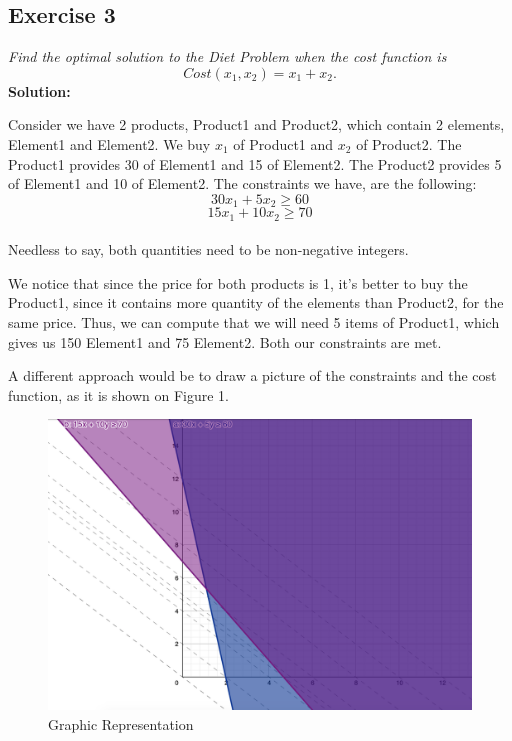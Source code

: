 \documentclass[12pt]{article}
\begin{document}
\subsection*{Exercise 3}
\textit{Find the optimal solution to the Diet Problem when the cost function is}\\
$$Cost(x_1, x_2) = x_1 + x_2.$$  
\textbf{Solution:} \par
Consider we have 2 products, Product1 and Product2, which contain 2 elements, Element1 and Element2. We buy $x_1$ of Product1 and $x_2$ of Product2. The Product1 provides 30 of Element1 and 15 of Element2. The Product2 provides 5 of Element1 and 10 of Element2. The constraints we have, are the following: \\
$$30x_1+5x_2 \geqslant 60$$ 
$$15x_1+10x_2 \geqslant 70$$ \\
Needless to say, both quantities need to be non-negative integers. \par
We notice that since the price for both products is 1, it's better to buy the Product1, since it contains more quantity of the elements than Product2, for the same price. Thus, we can compute that we will need 5 items of Product1, which gives us 150 Element1 and 75 Element2. Both our constraints are met. \par 
A different approach would be to draw a picture of the constraints and the cost function, as it is shown on Figure 1.

\begin{center}
	\begin{figure} 
        \includegraphics[totalheight=8cm]{figure.png}
		\caption{Graphic Representation}	
	\end{figure}        
\end{center} 
\newpage
\end{document}
